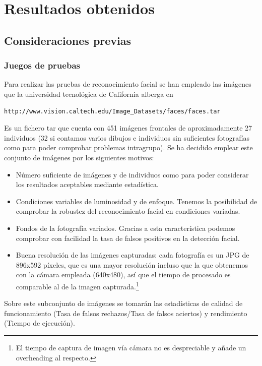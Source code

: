 \chapter{Resultados obtenidos}

\section{Consideraciones previas}

\subsection{Juegos de pruebas}
Para realizar las pruebas de reconocimiento facial se han empleado las imágenes que la universidad tecnológica de California alberga en 
\begin{verbatim}
http://www.vision.caltech.edu/Image_Datasets/faces/faces.tar 
\end{verbatim}
Es un fichero tar que cuenta con 451 imágenes frontales de aproximadamente 27 individuos (32 si contamos varios dibujos e individuos sin suficientes fotografías como para poder comprobar problemas intragrupo). Se ha decidido emplear este conjunto de imágenes por los siguientes motivos:
\begin{itemize}
	\item{Número suficiente de imágenes y de individuos como para poder considerar los resultados aceptables mediante estadística.}
	\item{Condiciones variables de luminosidad y de enfoque. Tenemos la posibilidad de comprobar la robustez del reconocimiento facial en condiciones variadas.}
	\item{Fondos de la fotografía variados. Gracias a esta característica podemos comprobar con facilidad la tasa de falsos positivos en la detección facial.}
	\item{Buena resolución de las imágenes capturadas: cada fotografía es un JPG de 896x592 píxeles, que es una mayor resolución incluso que la que obtenemos con la cámara empleada (640x480), así que el tiempo de procesado es comparable al de la imagen capturada.\footnote{El tiempo de captura de imagen vía cámara no es despreciable y añade un overheading al respecto.} }
\end{itemize}

Sobre este subconjunto de imágenes se tomarán las estadísticas de calidad de funcionamiento (Tasa de falsos rechazos/Tasa de falsos aciertos) y rendimiento (Tiempo de ejecución).


